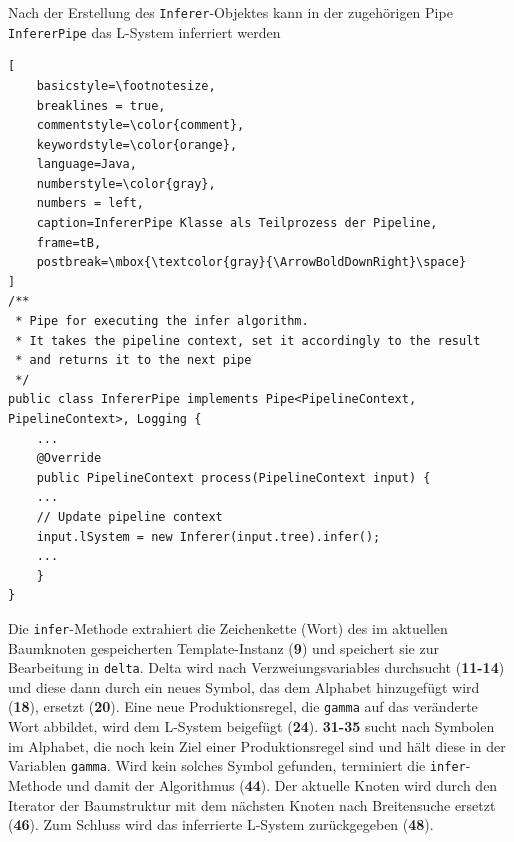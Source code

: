 Nach der Erstellung des \texttt{Inferer}-Objektes kann in der zugehörigen Pipe \texttt{InfererPipe} das L-System inferriert
werden
\begin{lstlisting}[
    basicstyle=\footnotesize,
    breaklines = true,
    commentstyle=\color{comment},
    keywordstyle=\color{orange},
    language=Java,
    numberstyle=\color{gray},
    numbers = left,
    caption=InfererPipe Klasse als Teilprozess der Pipeline,
    frame=tB,
    postbreak=\mbox{\textcolor{gray}{\ArrowBoldDownRight}\space}
]
/**
 * Pipe for executing the infer algorithm.
 * It takes the pipeline context, set it accordingly to the result
 * and returns it to the next pipe
 */
public class InfererPipe implements Pipe<PipelineContext, PipelineContext>, Logging {
    ...
    @Override
    public PipelineContext process(PipelineContext input) {
    ...
    // Update pipeline context
    input.lSystem = new Inferer(input.tree).infer();
    ...
    }
}
\end{lstlisting}

Die \texttt{infer}-Methode extrahiert die Zeichenkette (Wort) des im aktuellen Baumknoten gespeicherten Template-Instanz
(\textbf{9}) und speichert sie zur Bearbeitung in \texttt{delta}.
Delta wird nach Verzweiungsvariables durchsucht (\textbf{11-14}) und diese dann durch ein neues Symbol,
das dem Alphabet hinzugefügt wird (\textbf{18}), ersetzt (\textbf{20}).
Eine neue Produktionsregel, die \texttt{gamma} auf das veränderte Wort abbildet, wird dem L-System beigefügt (\textbf{24}).
\textbf{31-35} sucht nach Symbolen im Alphabet, die noch kein Ziel einer Produktionsregel sind und hält diese in der
Variablen \texttt{gamma}.
Wird kein solches Symbol gefunden, terminiert die \texttt{infer}-Methode und damit der Algorithmus (\textbf{44}).
Der aktuelle Knoten wird durch den Iterator der Baumstruktur mit dem nächsten Knoten nach Breitensuche ersetzt (\textbf{46}).
Zum Schluss wird das inferrierte L-System zurückgegeben (\textbf{48}).

